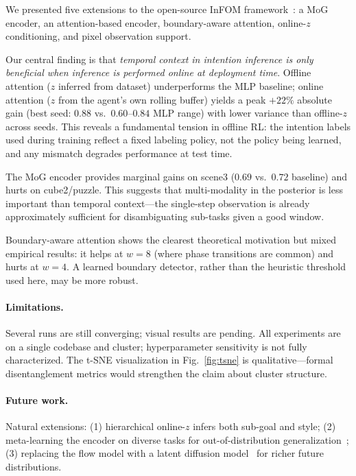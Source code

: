 \documentclass{article}
\newcommand{\base}{InFOM}
\begin{document}
We presented five extensions to the open-source
\base{} framework~\cite{zheng2025infom}: a MoG encoder,
an attention-based encoder, boundary-aware attention,
online-$z$ conditioning, and pixel observation support.

Our central finding is that \emph{temporal context
in intention inference is only beneficial when
inference is performed online at deployment time}.
Offline attention ($z$ inferred from dataset) underperforms
the MLP baseline; online attention ($z$ from the agent's
own rolling buffer) yields a peak $+22\%$ absolute gain
(best seed: $0.88$ vs.\ $0.60$--$0.84$ MLP range)
with lower variance than offline-$z$ across seeds.
This reveals a fundamental tension in offline RL:
the intention labels used during training reflect
a fixed labeling policy, not the policy being learned,
and any mismatch degrades performance at test time.

The MoG encoder provides marginal gains on scene3
($0.69$ vs.\ $0.72$ baseline) and hurts on cube2/puzzle.
This suggests that multi-modality in the posterior is
less important than temporal context—the single-step
observation is already approximately sufficient for
disambiguating sub-tasks given a good window.

Boundary-aware attention shows the clearest theoretical
motivation but mixed empirical results: it helps at $w=8$
(where phase transitions are common) and hurts at $w=4$.
A learned boundary detector, rather than the
heuristic threshold used here, may be more robust.

\paragraph{Limitations.}
Several runs are still converging; visual results are pending.
All experiments are on a single codebase and cluster;
hyperparameter sensitivity is not fully characterized.
The t-SNE visualization in Fig.~\ref{fig:tsne} is
qualitative—formal disentanglement metrics would
strengthen the claim about cluster structure.

\paragraph{Future work.}
Natural extensions: (1) hierarchical online-$z$
infers both sub-goal and style; (2) meta-learning the
encoder on diverse tasks for out-of-distribution
generalization~\cite{rakelly2019pearl}; (3) replacing
the flow model with a latent diffusion
model~\cite{rombach2022ldm} for richer future
distributions.

\clearpage



\end{document}
